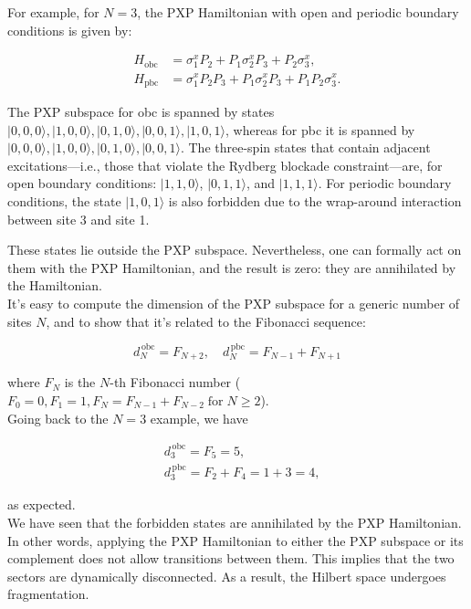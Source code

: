 \documentclass{article}
\begin{document}
For example, for \( N = 3 \), the PXP Hamiltonian with open and periodic boundary conditions is given by:

\begin{align} \label{ec}
H_{\mathrm{obc}} &= \sigma^x_1 P_2 + P_1\sigma^x_2 P_3 + P_2 \sigma^x_3, \\
H_{\mathrm{pbc}} &= \sigma^x_1 P_2 P_3 + P_1 \sigma^x_2 P_3 + P_1 P_2 \sigma^x_3.
\end{align}

The PXP subspace for obc is spanned by states $|0,0,0\rangle, |1,0,0\rangle, |0,1,0\rangle, |0,0,1\rangle, |1,0,1\rangle$, whereas for pbc it is spanned by  $|0,0,0\rangle, |1,0,0\rangle, |0,1,0\rangle, |0,0,1\rangle$. The three-spin states that contain adjacent excitations—i.e., those that violate the Rydberg blockade constraint—are, for open boundary conditions: \( |1,1,0\rangle \), \( |0,1,1\rangle \), and \( |1,1,1\rangle \). For periodic boundary conditions, the state \( |1,0,1\rangle \) is also forbidden due to the wrap-around interaction between site 3 and site 1.

These states lie outside the PXP subspace. Nevertheless, one can formally act on them with the PXP Hamiltonian, and the result is zero: they are annihilated by the Hamiltonian.\\

It's easy to compute the dimension of the PXP subspace for a generic number of sites $N$, and to show that it's related to the Fibonacci sequence:

\begin{equation}
d_N^{\mathrm{\,obc}} = F_{N+2}, \quad d_N^{\mathrm{\,pbc}} = F_{N-1} + F_{N+1}
\end{equation}

where $F_N$ is the $N$-th Fibonacci number ($F_0 = 0, F_1 = 1, F_N = F_{N-1} + F_{N-2} \; \mathrm{for} \; N\geq 2$).\\
Going back to the $N=3$ example, we have 

\begin{align}
&d_3^{\mathrm{\,obc}} = F_{5} = 5, \\
&d_3^{\mathrm{\,pbc}} = F_{2} + F_{4} = 1+3 = 4,
\end{align}

as expected.\\

We have seen that the forbidden states are annihilated by the PXP Hamiltonian. In other words, applying the PXP Hamiltonian to either the PXP subspace or its complement does not allow transitions between them. This implies that the two sectors are dynamically disconnected. As a result, the Hilbert space undergoes fragmentation.
\end{document}

